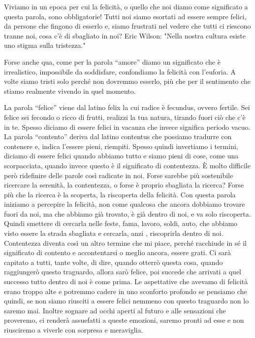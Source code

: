 \documentclass[12pt]{book} %
\begin{document}
\bigskip

Viviamo in un epoca per cui la felicità, o quello che noi diamo come significato a questa parola, sono obbligatorie!
Tutti noi siamo esortati ad essere sempre felici, da persone che fingono di esserlo e, siamo frustrati nel vedere che
tutti ci riescono tranne noi, cosa c'è di sbagliato in noi? Eric Wilson: "Nella
nostra cultura esiste uno stigma sulla tristezza."


\bigskip

Forse anche qua, come per la parola “amore” diamo un significato che è irrealistico, impossibile da soddisfare,
confondiamo la felicità con l'euforia. A volte siamo tristi solo perché non dovremmo esserlo, più
che per il sentimento che stiamo realmente vivendo in quel momento.


\bigskip

La parola “felice” viene dal latino felix la cui radice è fecundus, ovvero fertile. Sei felice sei fecondo o ricco di
frutti, realizzi la tua natura, tirando fuori ciò che c'è in te. Spesso diciamo di essere felici in vacanza che  invece significa periodo vacuo. 
La parola “contento” deriva dal latino contentus che possiamo tradurre con contenere e, indica l'essere pieni, riempiti. Spesso
quindi invertiamo i termini, diciamo di essere felici quando abbiamo tutto e siamo pieni di cose, come una
scorpacciata, quando invece questo è il significato di contentezza. È molto difficile però ridefinire delle parole così
radicate in noi. Forse sarebbe più sostenibile ricercare la serenità, la contentezza, o forse è proprio sbagliata la
ricerca? Forse più che la ricerca è la scoperta, la riscoperta della felicità. Con questa parola iniziamo a percepire
la felicità, non come qualcosa che ancora dobbiamo trovare fuori da noi, ma che abbiamo già trovato, è già dentro di
noi, e va solo riscoperta. Quindi smettere di cercarla nelle feste, fama, lavoro, soldi, auto, che abbiamo visto essere
la strada sbagliata e cercarla, anzi , riscoprirla dentro di noi. Contentezza diventa così un altro termine che mi
piace, perché racchiude in sé il significato di contento e accontentarsi o meglio ancora, essere grati. Ci sarà capitato a tutti, tante volte, di
dire, quando otterrò questa cosa, quando raggiungerò questo traguardo, allora sarò felice, poi succede che arrivati a
quel successo tutto dentro di noi è come prima. Le aspettative che avevamo di felicità erano troppo alte e potremmo
cadere in uno sconforto profondo se pensiamo che quindi, se non siamo riusciti a essere felici nemmeno con questo
traguardo non lo saremo mai. Inoltre sognare ad occhi aperti al futuro e alle sensazioni che proveremo, ci renderà
assuefatti a queste emozioni, saremo pronti ad esse e non riusciremo a viverle con sorpresa e meraviglia. 
\end{document}
